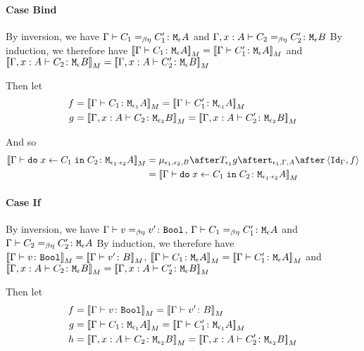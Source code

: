 {    \paragraph{Case Bind}
    By inversion, we have $\Gamma \vdash C_1 =_{\beta\eta} C_1' \colon \texttt{M}_{\epsilon}{A}$ and $\Gamma, x: A \vdash C_2 =_{\beta\eta} C_2' \colon \texttt{M}_{\epsilon}{B}$
    By induction, we therefore have ${\bf [\![}\Gamma \vdash C_1 \colon \texttt{M}_{\epsilon}{A}{\bf ]\!]}_M= {\bf [\![}\Gamma \vdash C_1' \colon \texttt{M}_{\epsilon}{A}{\bf ]\!]}_M$ and ${\bf [\![}\Gamma, x: A \vdash C_2 \colon \texttt{M}_{\epsilon}{B}{\bf ]\!]}_M = {\bf [\![}\Gamma, x: A \vdash C_2' \colon \texttt{M}_{\epsilon}{B}{\bf ]\!]}_M$

    Then let
    \begin{align}
        f &{}=\deno{\gtyperelation{C_1}{\M{\e_1}{A}}}= \deno{\gtyperelation{C_1'}{\M{\e_1}{A}}}\\
        g &{}=\deno{\typerelation{\gax}{C_2}{\M{\e_2}{B}}} = \deno{\typerelation{\gax}{C_2'}{\M{\e_2}{B}}}
    \end{align}



    And so
    \begin{equation}
        \begin{split}
            \deno{\gtyperelation{\doin{x}{C_1}{C_2}}{\M{\e_1\dot\e_2}{A}}} & = \bind{\e_1}{\e_2}{B} \after \T{\e_1}{g} \after \tstrength{\e_1}{\G}{A} \after \pr{\idg}{f}\\
             & = \deno{\gtyperelation{\doin{x}{C_1}{C_2}}{\M{\e_1\dot\e_2}{A}}}
        \end{split}
    \end{equation}
    \paragraph{Case If}
    By inversion, we have $\Gamma \vdash v =_{\beta\eta} v' \colon \texttt{Bool}$, $\Gamma \vdash C_1 =_{\beta\eta} C_1' \colon \texttt{M}_{\epsilon}{A}$ and $\Gamma \vdash C_2 =_{\beta\eta} C_2' \colon \texttt{M}_{\epsilon}{A}$
    By induction, we therefore have ${\bf [\![}\Gamma \vdash v \colon \texttt{Bool}{\bf ]\!]}_M = {\bf [\![}\Gamma \vdash v' \colon B{\bf ]\!]}_M$, ${\bf [\![}\Gamma \vdash C_1 \colon \texttt{M}_{\epsilon}{A}{\bf ]\!]}_M= {\bf [\![}\Gamma \vdash C_1' \colon \texttt{M}_{\epsilon}{A}{\bf ]\!]}_M$ and ${\bf [\![}\Gamma, x: A \vdash C_2 \colon \texttt{M}_{\epsilon}{B}{\bf ]\!]}_M = {\bf [\![}\Gamma, x: A \vdash C_2' \colon \texttt{M}_{\epsilon}{B}{\bf ]\!]}_M$

    Then let
    \begin{align}
        f &{}=\deno{\gtyperelation{v}{\B}} = \deno{\gtyperelation{v'}{B}}\\
        g &{}=\deno{\gtyperelation{C_1}{\M{\e_1}{A}}}= \deno{\gtyperelation{C_1'}{\M{\e_1}{A}}}\\
        h &{}=\deno{\typerelation{\gax}{C_2}{\M{\e_2}{B}}} = \deno{\typerelation{\gax}{C_2'}{\M{\e_2}{B}}}
    \end{align}



}
